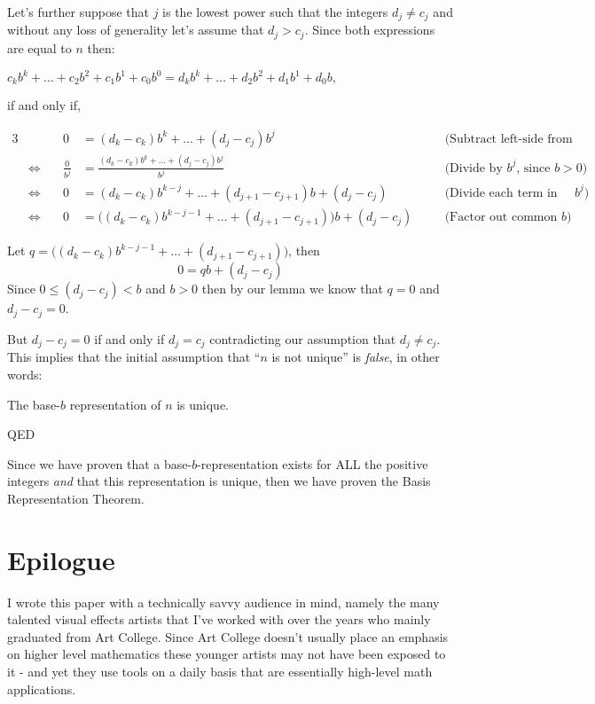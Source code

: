 \documentclass{article}
\begin{document}
Let's further suppose that $j$ is the lowest power such that the integers $d_j\ne{}c_j$ and without any loss of generality
let's assume that $d_j>c_j$. Since both expressions are equal to $n$ then:
\begin{center}
$c_kb^k+\dots+c_2b^2+c_1b^1+c_0b^0=d_kb^k+\dots+d_2b^2+d_1b^1+d_0b,$

\smallskip
if and only if,
\end{center}
{\small
\begin{alignat*}{3}
  &&0
  &= (d_k-c_k)b^k+\dots+(d_j-c_j)b^j&&\quad\text{(Subtract left-side from both-sides)}\\
  &\Leftrightarrow\quad
  &\frac{0}{b^j}
  &= \frac{(d_k-c_k)b^k+\dots+(d_j-c_j)b^j}{b^j} &&\quad\text{(Divide by }b^j\text{, since }b>0\text{)}\\
  &\Leftrightarrow\quad
  &0
  &=(d_k-c_k)b^{k-j}+\dots+(d_{j+1}-c_{j+1})b+(d_j-c_j) &&\quad\text{(Divide each term in numerator by }b^j{)}\\
  &\Leftrightarrow\quad
  &0
  &= \big((d_k-c_k)b^{k-j-1}+\dots+(d_{j+1}-c_{j+1})\big)b+(d_j-c_j) &&\quad\text{(Factor out common }b{)}
\end{alignat*}
}

Let $q=\big((d_k-c_k)b^{k-j-1}+\dots+(d_{j+1}-c_{j+1})\big)$, then
\[0=qb+(d_j-c_j)\]
Since $0\le(d_j-c_j)<b$ and $b>0$ then by our lemma we know that
$q=0$ and $d_j-c_j = 0$.

But $d_j-c_j = 0$ if and only if $d_j = c_j$
contradicting our assumption that $d_j\ne{}c_j$. This implies that the initial assumption that ``$n$
is not unique'' is \emph{false}, in other words:
\begin{center}
The base-$b$ representation of $n$ is unique.
\end{center}
\hspace*{\fill}QED

\bigskip
Since we have proven that a base-$b$-representation exists for ALL the positive integers \emph{and}
that this representation is unique, then we
have proven the Basis Representation Theorem.

\break
\section*{Epilogue}

I wrote this paper with a technically savvy audience in mind, namely the many talented visual effects artists
that I've worked with over the years who mainly graduated from Art College. Since Art College doesn't
usually place an emphasis on higher level mathematics these younger artists may not have been exposed to
it - and yet they use tools on a daily basis that are essentially high-level math applications.
\end{document}

